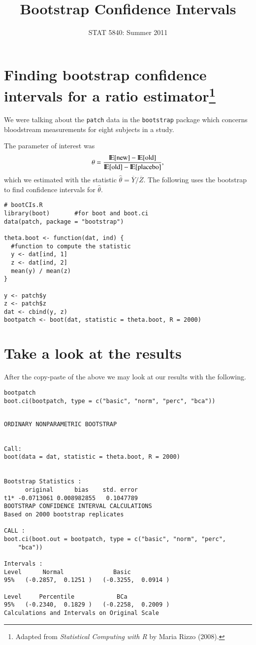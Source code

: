\documentclass[11pt,english]{article}
\title{Bootstrap Confidence Intervals}
\date{STAT 5840: Summer 2011}
\begin{document}
\maketitle

\thispagestyle{empty}

\section*{Finding bootstrap confidence intervals for a ratio estimator\footnote{Adapted from \emph{Statistical Computing with R} by Maria Rizzo (2008). }}
\label{sec-1}

We were talking about the \texttt{patch} data in the \texttt{bootstrap} package which concerns bloodstream measurements for eight subjects in a study. 



The parameter of interest was
\[
\theta = \frac{\mathrm{I\hspace{-1.5pt}E}[\mathrm{new}] - \mathrm{I\hspace{-1.5pt}E}[\mathrm{old}]}{\mathrm{I\hspace{-1.5pt}E}[\mathrm{old}] - \mathrm{I\hspace{-1.5pt}E}[\mathrm{placebo}]},
\]
which we estimated with the statistic \(\hat{\theta} = \overline{Y}/\overline{Z}\).  The following uses the bootstrap to find confidence intervals for $\hat{\theta}$.


\begin{verbatim}
# bootCIs.R
library(boot)       #for boot and boot.ci
data(patch, package = "bootstrap")

theta.boot <- function(dat, ind) {
  #function to compute the statistic
  y <- dat[ind, 1]
  z <- dat[ind, 2]
  mean(y) / mean(z)
}

y <- patch$y
z <- patch$z
dat <- cbind(y, z)
bootpatch <- boot(dat, statistic = theta.boot, R = 2000)
\end{verbatim}
\section*{Take a look at the results}
\label{sec-2}

After the copy-paste of the above we may look at our results with the following.

\begin{verbatim}
bootpatch
boot.ci(bootpatch, type = c("basic", "norm", "perc", "bca"))
\end{verbatim}





\begin{verbatim}

ORDINARY NONPARAMETRIC BOOTSTRAP


Call:
boot(data = dat, statistic = theta.boot, R = 2000)


Bootstrap Statistics :
      original      bias    std. error
t1* -0.0713061 0.008982855   0.1047789
BOOTSTRAP CONFIDENCE INTERVAL CALCULATIONS
Based on 2000 bootstrap replicates

CALL : 
boot.ci(boot.out = bootpatch, type = c("basic", "norm", "perc", 
    "bca"))

Intervals : 
Level      Normal              Basic         
95%   (-0.2857,  0.1251 )   (-0.3255,  0.0914 )  

Level     Percentile            BCa          
95%   (-0.2340,  0.1829 )   (-0.2258,  0.2009 )  
Calculations and Intervals on Original Scale
\end{verbatim}
\end{document}
